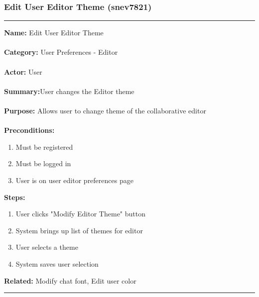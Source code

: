 \documentclass[11pt]{report}
\begin{document}
\subsubsection{Edit User Editor Theme (snev7821)}
\vspace{2pt}
\hrule
\vspace{8pt}
	\noindent\textbf{Name:} Edit User Editor Theme \\ \\
	\textbf{Category:} User Preferences - Editor  \\ \\
	\textbf{Actor:} User \\ \\
	\textbf{Summary:}User changes the Editor theme \\ \\
	\textbf{Purpose:} Allows user to change theme of the collaborative editor \\ \\
	\textbf{Preconditions:} 
	\begin{enumerate}
		\item Must be registered
		\item Must be logged in
		\item User is on user editor preferences page
	\end{enumerate}
	\textbf{Steps:}
	\begin{enumerate}
		\item User clicks "Modify Editor Theme" button
		\item System brings up list of themes for editor
		\item User selects a theme
		\item System saves user selection
	\end{enumerate}
	\textbf{Related:} Modify chat font, Edit user color 
\vspace{8pt}
\hrule
\newpage
\end{document}
